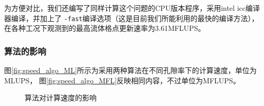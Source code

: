 为方便对比，我们还编写了同样计算这个问题的CPU版本程序，采用intel icc编译器编译，并加上了
\texttt{-fast}编译选项（这是目前我们所能利用的最快的编译方法），
在各种工况下观测到的最高流体格点更新速率为3.61MFLUPS。

\subsubsection{算法的影响}
图\ref{fig:speed_algo_ML}所示为采用两种算法在不同孔隙率下的计算速度，单位为MLUPS，
图\ref{fig:speed_algo_MFL}反映相同内容，不过单位为MFLUPS。
\begin{figure}[htb]
  \centering
  \caption{算法对计算速度的影响}
\end{figure}
